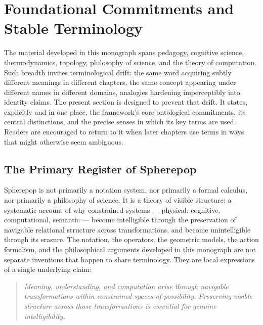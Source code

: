\documentclass[12pt,openany]{book}
\theoremstyle{plain}
\theoremstyle{definition}
\theoremstyle{remark}
\begin{document}

\section{Foundational Commitments and Stable Terminology}
\label{sec:foundations}

The material developed in this monograph spans pedagogy, cognitive science, thermodynamics, topology, philosophy of science, and the theory of computation. Such breadth invites terminological drift: the same word acquiring subtly different meanings in different chapters, the same concept appearing under different names in different domains, analogies hardening imperceptibly into identity claims. The present section is designed to prevent that drift. It states, explicitly and in one place, the framework's core ontological commitments, its central distinctions, and the precise senses in which its key terms are used. Readers are encouraged to return to it when later chapters use terms in ways that might otherwise seem ambiguous.

\subsection*{The Primary Register of Spherepop}

Spherepop is not primarily a notation system, nor primarily a formal calculus, nor primarily a philosophy of science. It is a theory of visible structure: a systematic account of why constrained systems — physical, cognitive, computational, semantic — become intelligible through the preservation of navigable relational structure across transformations, and become unintelligible through its erasure. The notation, the operators, the geometric models, the action formalism, and the philosophical arguments developed in this monograph are not separate inventions that happen to share terminology. They are local expressions of a single underlying claim:

\begin{quote}
\itshape
Meaning, understanding, and computation arise through navigable transformations within constrained spaces of possibility. Preserving visible structure across those transformations is essential for genuine intelligibility.
\end{quote}
\end{document}
